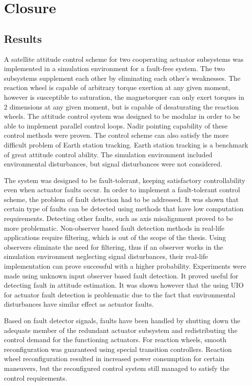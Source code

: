 \chapter{Closure}

\section{Results}

A satellite attitude control scheme for two cooperating actuator subsystems was implemented in a simulation environment for a fault-free system. The two subsystems supplement each other by eliminating each other's weaknesses. The reaction wheel is capable of arbitrary torque exertion at any given moment, however is susceptible to saturation, the magnetorquer can only exert torques in 2 dimensions at any given moment, but is capable of desaturating the reaction wheels. The attitude control system was designed to be modular in order to be able to implement parallel control loops.
Nadir pointing capability of these control methods were proven. The control scheme can also satisfy the more difficult problem of Earth station tracking. Earth station tracking is a benchmark of great attitude control ability. The simulation environment included environmental disturbances, but signal disturbances were not considered. 

The system was designed to be fault-tolerant, keeping satisfactory controllability even when actuator faults occur. In order to implement a fault-tolerant control scheme, the problem of fault detection had to be addressed. It was shown that certain type of faults can be detected using methods that have low computation requirements. Detecting other faults, such as axis misalignment proved to be more problematic. Non-observer based fault detection methods in real-life applications require filtering, which is out of the scope of the thesis. Using observers eliminate the need for filtering, thus if an observer works in the simulation environment neglecting signal disturbances, their real-life implementation can prove successful with a higher probability. Experiments were made using unknown input observer based fault detection. It proved useful for detecting fault in attitude estimation. It was shown however that the using UIO for actuator fault detection is problematic due to the fact that environmental disturbances have similar effect as actuator faults.

Based on fault detector signals, faults have been handled by shutting down the adequate member of the redundant actuator subsystem and redistributing the control demand for the functioning actuators. For reaction wheels, smooth reconfiguration was guaranteed using special transition controllers. Reaction wheel reconfiguration resulted in increased power consumption for certain maneuvers, but the reconfigured control system still managed to satisfy the control requirements.


